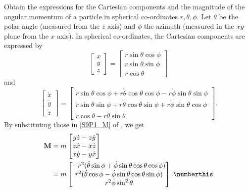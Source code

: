 \begin{problem}[title={Angular momentum in spherical co-ordinates}]
{
Obtain the expressions for the Cartesian components and the magnitude of the angular momentum of a particle in spherical co-ordinates $r,\theta,\phi$.
}
{
Let $\theta$ be the polar angle (measured from the $z$ axis) and $\phi$ the azimuth (measured in the $xy$ plane from the $x$ axis). In spherical co-ordinates, the Cartesian components are expressed by
\begin{equation*}
    \begin{bmatrix} x \\ y \\ z \end{bmatrix} = \begin{bmatrix} r \sin{\theta} \cos{\phi} \\ r \sin{\theta} \sin{\phi} \\ r \cos{\theta} \end{bmatrix}
\end{equation*}
and
\begin{equation*}
    \begin{bmatrix} \Dot{x} \\ \Dot{y} \\ \Dot{z} \end{bmatrix} = \begin{bmatrix} \Dot{r}\sin{\theta}\cos{\phi} + r\Dot{\theta}\cos{\theta}\cos{\phi} - r\Dot{\phi}\sin{\theta}\sin{\phi} \\ \Dot{r}\sin{\theta}\sin{\phi} + r\Dot{\theta}\cos{\theta}\sin{\phi} + r\Dot{\phi}\sin{\theta}\cos{\phi} \\ \Dot{r}\cos{\theta} - r\Dot{\theta}\sin{\theta} \end{bmatrix}.
\end{equation*}
By substituting those in \eqref{S9P1_M} of , we get
\begin{align*}
    \mathbf{M} &= m \begin{bmatrix} y \Dot{z} - z \Dot{y} \\ z \Dot{x} - x \Dot{z} \\ x \Dot{y} - y \Dot{x} \end{bmatrix} \\
    &= m \begin{bmatrix} -r^2(\Dot{\theta}\sin{\phi} + \Dot{\phi}\sin{\theta}\cos{\theta}\cos{\phi}) \\ r^2(\Dot{\theta}\cos{\phi} - \Dot{\phi}\sin{\theta}\cos{\theta}\sin{\phi}) \\ r^2\Dot{\phi}\sin^2{\theta} \end{bmatrix} . \numberthis \label{S9P2_M}

\end{align*}}
\end{problem}
